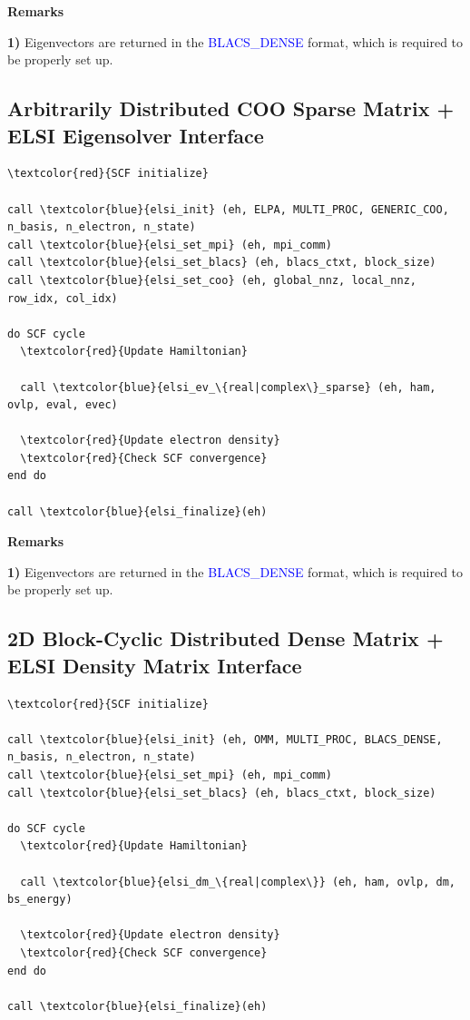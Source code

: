 \documentclass{report}
\begin{document}
\textbf{Remarks}

\textbf{1)} Eigenvectors are returned in the \textcolor{blue}{BLACS\_DENSE} format, which is required to be properly set up.

\subsection*{Arbitrarily Distributed COO Sparse Matrix + ELSI Eigensolver Interface}
\begin{tcolorbox}
\begin{Verbatim}[commandchars=\\\{\}]
\textcolor{red}{SCF initialize}

call \textcolor{blue}{elsi_init} (eh, ELPA, MULTI_PROC, GENERIC_COO, n_basis, n_electron, n_state)
call \textcolor{blue}{elsi_set_mpi} (eh, mpi_comm)
call \textcolor{blue}{elsi_set_blacs} (eh, blacs_ctxt, block_size)
call \textcolor{blue}{elsi_set_coo} (eh, global_nnz, local_nnz, row_idx, col_idx)

do SCF cycle
  \textcolor{red}{Update Hamiltonian}

  call \textcolor{blue}{elsi_ev_\{real|complex\}_sparse} (eh, ham, ovlp, eval, evec)

  \textcolor{red}{Update electron density}
  \textcolor{red}{Check SCF convergence}
end do

call \textcolor{blue}{elsi_finalize}(eh)
\end{Verbatim}
\end{tcolorbox}

\textbf{Remarks}

\textbf{1)} Eigenvectors are returned in the \textcolor{blue}{BLACS\_DENSE} format, which is required to be properly set up.

\subsection*{2D Block-Cyclic Distributed Dense Matrix + ELSI Density Matrix Interface}
\begin{tcolorbox}
\begin{Verbatim}[commandchars=\\\{\}]
\textcolor{red}{SCF initialize}

call \textcolor{blue}{elsi_init} (eh, OMM, MULTI_PROC, BLACS_DENSE, n_basis, n_electron, n_state)
call \textcolor{blue}{elsi_set_mpi} (eh, mpi_comm)
call \textcolor{blue}{elsi_set_blacs} (eh, blacs_ctxt, block_size)

do SCF cycle
  \textcolor{red}{Update Hamiltonian}

  call \textcolor{blue}{elsi_dm_\{real|complex\}} (eh, ham, ovlp, dm, bs_energy)

  \textcolor{red}{Update electron density}
  \textcolor{red}{Check SCF convergence}
end do

call \textcolor{blue}{elsi_finalize}(eh)
\end{Verbatim}
\end{tcolorbox}
\end{document}
